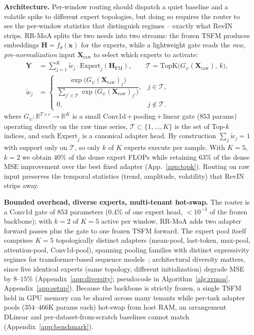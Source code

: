 \documentclass{article}
\begin{document}
\textbf{Architecture.} Per-window routing should dispatch a quiet baseline and a volatile spike to different expert topologies, but doing so requires the router to see the per-window statistics that distinguish regimes -- exactly what RevIN strips. RR-MoA splits the two needs into two streams: the frozen TSFM produces embeddings $\mathbf{H}{=}f_\theta(\mathbf{x})$ for the experts, while a lightweight gate reads the \textit{raw, pre-normalization} input $\mathbf{X}_\text{raw}$ to select which experts to activate:
\begin{equation}
\begin{aligned}
\mathbf{Y} &= \sum_{j=1}^{K} \widetilde{w}_j \cdot \text{Expert}_j(\mathbf{H}_\text{FM}), \qquad
\mathcal{T} = \mathrm{TopK}\!\bigl(G_\psi(\mathbf{X}_\text{raw}),\, k\bigr), \\
\widetilde{w}_j &= \begin{cases}
\dfrac{\exp\!\bigl(G_\psi(\mathbf{X}_\text{raw})_j\bigr)}{\sum_{j'\in\mathcal{T}}\exp\!\bigl(G_\psi(\mathbf{X}_\text{raw})_{j'}\bigr)}, & j\in\mathcal{T},\\[4pt]
0, & j\notin\mathcal{T}.
\end{cases}
\end{aligned}
\label{eq:rrmoa}
\end{equation}
where $G_\psi: \mathbb{R}^{T\times c} \to \mathbb{R}^K$ is a small Conv1d\,+\,pooling\,+\,linear gate ($853$ params) operating directly on the raw time series, $\mathcal{T} \subset \{1,\ldots,K\}$ is the set of Top-$k$ indices, and each $\mathrm{Expert}_j$ is a canonical adapter head. By construction $\sum_j \widetilde{w}_j = 1$ with support only on $\mathcal{T}$, so only $k$ of $K$ experts execute per sample. With $K{=}5$, $k{=}2$ we obtain $40\%$ of the dense expert FLOPs while retaining $63\%$ of the dense MSE improvement over the best fixed adapter (App.~\ref{app:topk}). Routing on raw input preserves the temporal statistics (trend, amplitude, volatility) that RevIN strips away.

\textbf{Bounded overhead, diverse experts, multi-tenant hot-swap.} The router is a Conv1d gate of $853$ parameters ($0.4\%$ of one expert head, ${<}10^{-3}$ of the frozen backbone); with $k{=}2$ of $K{=}5$ active per window, RR-MoA adds two adapter forward passes plus the gate to one frozen TSFM forward. The expert pool itself comprises $K{=}5$ topologically distinct adapters (mean-pool, last-token, max-pool, attention-pool, Conv1d-pool), spanning pooling families with distinct expressivity regimes for transformer-based sequence models~\citep{ennadir2025pooling}; architectural diversity matters, since five identical experts (same topology, different initialization) degrade MSE by $8$--$15\%$ (Appendix~\ref{app:diversity}; pseudocode in Algorithm~\ref{alg:rrmoa}, Appendix~\ref{app:setup}). Because the backbone is strictly frozen, a single TSFM held in GPU memory can be shared across many tenants while per-task adapter pools ($354$--$466$K params each) hot-swap from host RAM, an arrangement DLinear and per-dataset-from-scratch baselines cannot match (Appendix~\ref{app:benchmark}).
\end{document}
